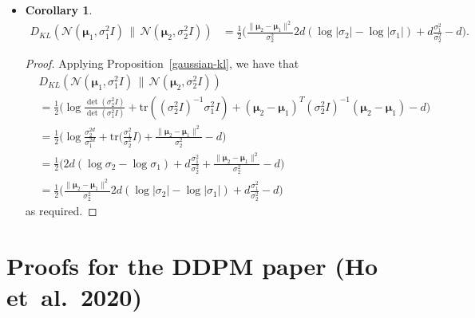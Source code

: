 \documentclass[10pt]{article}
\newtheorem{corollary}[lemma]{Corollary}
\newcommand{\ves}[1]{\boldsymbol{#1}}
\newcommand{\etal}{{et~al.}}
\newcommand{\tr}{\mathrm{tr}}
\begin{document}
\begin{itemize}
  \item \begin{corollary} \label{gaussian-kl-spherical}
    \begin{align*}
      D_{KL}(\mathcal{N}(\ves{\mu}_1, \sigma_1^2 I)\, \|\, \mathcal{N}(\ves{\mu}_2, \sigma_2^2 I))
      &= \frac{1}{2} \bigg( 
        \frac{\| \ves{\mu}_2 - \ves{\mu}_1 \|^2}{\sigma_2^2}          
        2d(\log |\sigma_2| - \log |\sigma_1|)
        + d \frac{\sigma_1^2}{\sigma_2^2} 
        - d
        \bigg).
    \end{align*}
  \end{corollary}

  \begin{proof}
    Applying Proposition~\ref{gaussian-kl}, we have that
    \begin{align*}
      & D_{KL}(\mathcal{N}(\ves{\mu}_1, \sigma_1^2 I)\, \|\, \mathcal{N}(\ves{\mu}_2, \sigma_2^2 I)) \\
      &= \frac{1}{2} \bigg(  \log \frac{\det (\sigma_2^2 I)}{\det (\sigma_1^2 I)}  + \tr( (\sigma_2^2 I)^{-1}\sigma_1^2 I ) + (\ves{\mu}_2 - \ves{\mu}_1)^T (\sigma_2^2 I)^{-1} (\ves{\mu}_2 - \ves{\mu}_1) - d  \bigg) \\
      &= \frac{1}{2} \bigg(  
        \log \frac{\sigma_2^{2d}}{\sigma_1^{2d}}  
        + \tr\Big( \frac{\sigma_1^2}{\sigma_2^2} I \Big) 
        + \frac{\| \ves{\mu}_2 - \ves{\mu}_1 \|^2}{\sigma_2^2}
        - d  \bigg) \\
      &= \frac{1}{2} \bigg( 
        2d(\log \sigma_2 - \log \sigma_1)
        + d \frac{\sigma_1^2}{\sigma_2^2} 
        + \frac{\| \ves{\mu}_2 - \ves{\mu}_1 \|^2}{\sigma_2^2}
        - d
        \bigg) \\
        &= \frac{1}{2} \bigg( 
          \frac{\| \ves{\mu}_2 - \ves{\mu}_1 \|^2}{\sigma_2^2}          
          2d(\log |\sigma_2| - \log |\sigma_1|)
          + d \frac{\sigma_1^2}{\sigma_2^2} 
          - d
          \bigg)
    \end{align*}
    as required.
  \end{proof}
\end{itemize}

\section{Proofs for the DDPM paper (Ho \etal\ 2020)} \label{sec:ddpm-proofs}
\end{document}
